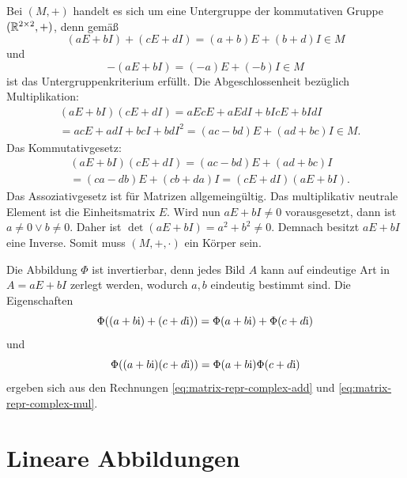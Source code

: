 \begin{Beweis}
Bei $(M,+)$ handelt es sich um eine Untergruppe der
kommutativen Gruppe $(\mathbb R^{2\times 2},+)$, denn gemäß
\begin{equation}\label{eq:matrix-repr-complex-add}
(aE+bI)+(cE+dI) = (a+b)E+(b+d)I \in M
\end{equation}
und
\begin{equation}
-(aE+bI) = (-a)E+(-b)I\in M
\end{equation}
ist das Untergruppenkriterium erfüllt. Die Abgeschlossenheit
bezüglich Multiplikation:
\begin{equation}\label{eq:matrix-repr-complex-mul}
\begin{split}
&(aE+bI)(cE+dI) = aEcE+aEdI+bIcE+bIdI\\
&= acE+adI+bcI+bdI^2
= (ac-bd)E+(ad+bc)I \in M.
\end{split}
\end{equation}
Das Kommutativgesetz:
\begin{equation}
\begin{split}
&(aE+bI)(cE+dI) = (ac-bd)E+(ad+bc)I\\
&= (ca-db)E+(cb+da)I = (cE+dI)(aE+bI).
\end{split}
\end{equation}
Das Assoziativgesetz ist für Matrizen allgemeingültig. Das multiplikativ
neutrale Element ist die Einheitsmatrix $E$. Wird nun $aE+bI\ne 0$
vorausgesetzt, dann ist $a\ne 0\lor b\ne 0$. Daher ist
$\det(aE+bI)=a^2+b^2\ne 0$. Demnach besitzt $aE+bI$ eine Inverse.
Somit muss $(M,+,\cdot)$ ein Körper sein.

Die Abbildung $\Phi$ ist invertierbar, denn jedes Bild $A$ kann
auf eindeutige Art in $A=aE+bI$ zerlegt werden, wodurch $a,b$
eindeutig bestimmt sind. Die Eigenschaften
\begin{equation}
\Phi((a+b\mathrm i)+(c+d\mathrm i)) = \Phi(a+b\mathrm i)+\Phi(c+d\mathrm i)
\end{equation}
und
\begin{equation}
\Phi((a+b\mathrm i)(c+d\mathrm i)) = \Phi(a+b\mathrm i)\Phi(c+d\mathrm i)
\end{equation}
ergeben sich aus den Rechnungen \eqref{eq:matrix-repr-complex-add}
und \eqref{eq:matrix-repr-complex-mul}.\;\qedsymbol
\end{Beweis}

\newpage
\section{Lineare Abbildungen}

